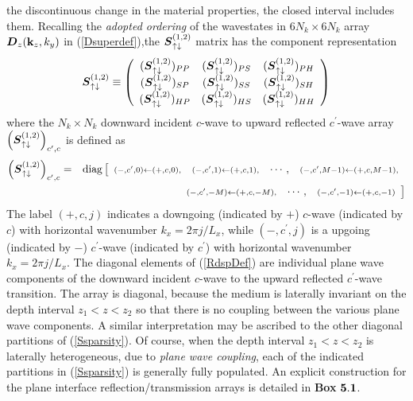 the discontinuous change in the material properties, the closed interval 
includes them. Recalling the {\em adopted ordering\/} of the wavestates 
in $6 N_k \times 6 N_k$ array ${\mbox{\boldmath$\mit D$\unboldmath}}_{z}({\bf k}_{z},k_{y})$
in (\ref{Dsuperdef}),the ${\mbox{\boldmath$\mit S$\unboldmath}}_{\uparrow\downarrow }^{(1 , 2)}$ matrix 
has the component representation
\begin{equation} \label{Ssparsity}
{\mbox{\boldmath$\mit S$\unboldmath}}{}_{\uparrow\downarrow }^{(1,2)} \equiv 
\left({\begin{array}{ccc}
({\mbox{\boldmath$\mit S$\unboldmath}}{}_{\uparrow\downarrow }^{(1,2)})_{  PP}&
({\mbox{\boldmath$\mit S$\unboldmath}}{}_{\uparrow\downarrow }^{(1,2)})_{  PS}&
({\mbox{\boldmath$\mit S$\unboldmath}}{}_{\uparrow\downarrow }^{(1,2)})_{  PH}\\ 
({\mbox{\boldmath$\mit S$\unboldmath}}{}_{\uparrow\downarrow }^{(1,2)})_{  SP}&
({\mbox{\boldmath$\mit S$\unboldmath}}{}_{\uparrow\downarrow }^{(1,2)})_{  SS}&
({\mbox{\boldmath$\mit S$\unboldmath}}{}_{\uparrow\downarrow }^{(1,2)})_{  SH}\\ 
({\mbox{\boldmath$\mit S$\unboldmath}}{}_{\uparrow\downarrow }^{(1,2)})_{  HP}&
({\mbox{\boldmath$\mit S$\unboldmath}}{}_{\uparrow\downarrow }^{(1,2)})_{  HS}&
({\mbox{\boldmath$\mit S$\unboldmath}}{}_{\uparrow\downarrow }^{(1,2)})_{  HH} 
\end{array}}\right) 
\end{equation} 
where the $N_k \times N_k$ downward incident $c$-wave 
to upward reflected $c^{\prime}$-wave array 
${\left({\mbox{\boldmath$\mit S$\unboldmath}}{}_{\uparrow\downarrow 
}^{(1,2)}\right)}_{c^{\prime},c}$  is defined as
\begin{eqnarray}\label{RdspDef}
{\left({\mbox{\boldmath$\mit S$\unboldmath}}{}_{\uparrow\downarrow }^{(1,2)}\right)}_{c^{\prime},c}&=&
\mbox{diag}\left[\begin{array}{cccc}
\scriptstyle (-, c^{\prime} ,0) \leftarrow (+, c ,0),&
\scriptstyle (-, c^{\prime} ,1) \leftarrow (+, c ,1),&
\cdots, &
\scriptstyle (-, c^{\prime} ,M-1) \leftarrow (+, c 
,M-1),\end{array}\right.\nonumber\\
&&\qquad\qquad\qquad\qquad\quad
\left.\begin{array}{ccc}
\scriptstyle (-, c^{\prime} ,-M) \leftarrow (+, c ,-M),&
\cdots, &
\scriptstyle (-, c^{\prime} ,-1) \leftarrow (+, c ,-1)
\end{array}\right]
\end{eqnarray}
The label $(+, c ,j)$ indicates a downgoing (indicated 
by $+$) $c$-wave (indicated by $c$) with horizontal wavenumber 
$k_{x}=2\pi j/L_{x}$, while  $(-, c^{\prime} ,j)$ 
is a upgoing (indicated 
by $-$) $c^{\prime}$-wave (indicated by $c^{\prime}$) with horizontal wavenumber 
$k_{x}=2\pi j/L_{x}$.
The diagonal elements of (\ref{RdspDef}) are individual plane wave components 
of the downward incident $c$-wave to the upward reflected $c^{\prime}$-wave 
transition.
The array is diagonal, because the medium is laterally invariant on the 
depth interval $z_1 < z < z_2$ so that there is no coupling between the 
various plane wave components. A similar interpretation may be ascribed 
to the other diagonal partitions of   (\ref{Ssparsity}). Of course, when 
the depth interval $z_1 < z < z_2$ is laterally heterogeneous, due to 
{\em plane wave coupling\/}, each of 
the indicated partitions in (\ref{Ssparsity}) is generally fully populated.
An explicit construction for the plane interface reflection/transmission 
arrays is detailed in {\sc \bf  Box} $ {\bf  5.1}$.

